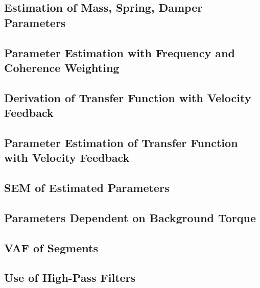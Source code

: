 \documentclass[11pt,a4paper]{article}
\begin{document}
\subsection{Estimation of Mass, Spring, Damper Parameters}

\subsection{Parameter Estimation with Frequency and Coherence Weighting}

\subsection{Derivation of Transfer Function with Velocity Feedback}

\subsection{Parameter Estimation of Transfer Function with Velocity Feedback}

\subsection{SEM of Estimated Parameters}

\subsection{Parameters Dependent on Background Torque}

\subsection{VAF of Segments}

\subsection{Use of High-Pass Filters}
\end{document}
